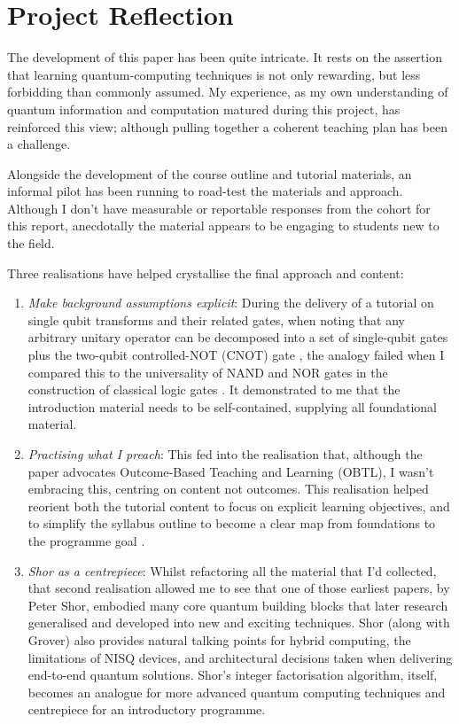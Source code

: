 \section{Project Reflection}

The development of this paper has been quite intricate.  
It rests on the assertion that learning quantum‑computing techniques 
is not only rewarding, but less forbidding than commonly assumed.
My experience, as my own understanding of quantum information and computation matured during this project, 
has reinforced this view; although pulling together a coherent teaching plan has been a challenge.

Alongside the development of the course outline and tutorial materials, 
an informal pilot has been running to road-test the materials and approach. 
Although I don't have measurable or reportable responses from the cohort for this report, 
anecdotally the material appears to be engaging to students new to the field.

Three realisations have helped crystallise the final approach and content:
\begin{enumerate}
\item \emph{Make background assumptions explicit}: 
During the delivery of a tutorial on single qubit transforms and their related gates,
when noting that any arbitrary unitary operator can be decomposed 
into a set of single-qubit gates plus the two-qubit controlled-NOT (CNOT) gate \cite{Nielsen:2010},
the analogy failed when I compared this to the universality of NAND and NOR gates 
in the construction of classical logic gates \cite{Wikipedia:UniversalLogicGates}.
It demonstrated to me that the introduction material needs to be self-contained,
supplying all foundational material.

\item \emph{Practising what I preach}: This fed into the realisation that, 
although the paper advocates Outcome‑Based Teaching and Learning (OBTL), 
I wasn't embracing this, centring on content not outcomes.  
This realisation helped reorient both the tutorial content to focus on explicit learning objectives,
and to simplify the syllabus outline to become a clear map from foundations to the programme goal \cite{Wong:2011}.

\item \emph{Shor as a centrepiece}: Whilst refactoring all the material that I'd collected, 
that second realisation allowed me to see that one of those earliest papers, by Peter Shor, 
embodied many core quantum building blocks that later research generalised and developed into new and exciting techniques. 
Shor (along with Grover) also provides natural talking points for hybrid computing, the limitations of NISQ devices, 
and architectural decisions taken when delivering end-to-end quantum solutions.  
Shor's integer factorisation algorithm, itself, becomes an analogue for more advanced quantum computing techniques
and centrepiece for an introductory programme.
\end{enumerate}